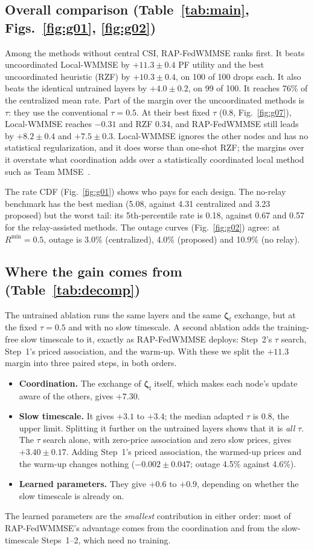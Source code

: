 \documentclass[conference]{IEEEtran}
\newcommand{\zf}{\boldsymbol{\zeta}_{\mathrm{f}}}
\begin{document}
\subsection{Overall comparison (Table~\ref{tab:main}, Figs.~\ref{fig:g01},
\ref{fig:g02})}
Among the methods without central CSI, RAP-FedWMMSE ranks first. It beats
uncoordinated Local-WMMSE by $+11.3\pm0.4$ PF utility and the best
uncoordinated heuristic (RZF) by $+10.3\pm0.4$, on 100 of 100 drops each. It
also beats the identical untrained layers by $+4.0\pm0.2$, on 99 of 100. It
reaches 76\% of the centralized mean rate. Part of the margin over the
uncoordinated methods is $\tau$: they use the conventional $\tau=0.5$. At
their best fixed $\tau$ (0.8, Fig.~\ref{fig:g07}), Local-WMMSE reaches
$-0.31$ and RZF 0.34, and RAP-FedWMMSE still leads by $+8.2\pm0.4$ and
$+7.5\pm0.3$. Local-WMMSE ignores the other nodes and has no statistical
regularization, and it does worse than one-shot RZF; the margins over it
overstate what coordination adds over a statistically coordinated local
method such as Team MMSE~\cite{miretti2022team}.

The rate CDF (Fig.~\ref{fig:g01}) shows who pays for each design. The
no-relay benchmark has the best median (5.08, against 4.31 centralized and
3.23 proposed) but the worst tail: its 5th-percentile rate is 0.18, against
0.67 and 0.57 for the relay-assisted methods. The outage curves
(Fig.~\ref{fig:g02}) agree: at $R^{\min}=0.5$, outage is 3.0\% (centralized),
4.0\% (proposed) and 10.9\% (no relay).

\subsection{Where the gain comes from (Table~\ref{tab:decomp})}
\label{sec:decomp}
The untrained ablation runs the same layers and the same $\zf$ exchange, but
at the fixed $\tau=0.5$ and with no slow timescale. A second ablation adds
the training-free slow timescale to it, exactly as RAP-FedWMMSE deploys:
Step~2's $\tau$ search, Step~1's priced association, and the warm-up. With
these we split the $+11.3$ margin into three paired steps, in both orders.
\begin{itemize}
  \item \textbf{Coordination.} The exchange of $\zf$ itself, which makes each
    node's update aware of the others, gives $+7.30$.
  \item \textbf{Slow timescale.} It gives $+3.1$ to $+3.4$; the median
    adapted $\tau$ is 0.8, the upper limit. Splitting it further on the
    untrained layers shows that it is \emph{all} $\tau$. The $\tau$ search
    alone, with zero-price association and zero slow prices, gives
    $+3.40\pm0.17$. Adding Step~1's priced association, the warmed-up prices
    and the warm-up changes nothing ($-0.002\pm0.047$; outage 4.5\% against
    4.6\%).
  \item \textbf{Learned parameters.} They give $+0.6$ to $+0.9$, depending on
    whether the slow timescale is already on.
\end{itemize}
The learned parameters are the \emph{smallest} contribution in either order:
most of RAP-FedWMMSE's advantage comes from the coordination and from the
slow-timescale Steps~1--2, which need no training.
\end{document}
